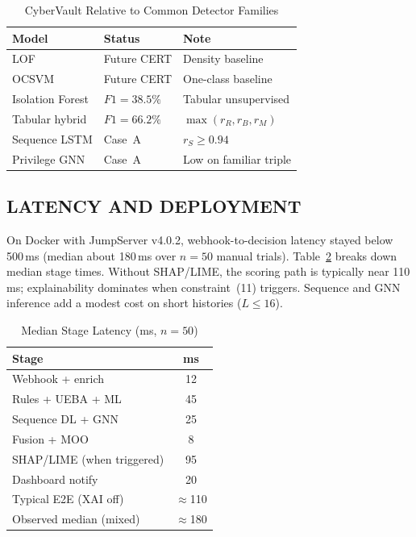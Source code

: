 \documentclass{ieeeaccess}
\begin{document}
\begin{table}[!t]
\caption{CyberVault Relative to Common Detector Families}
\label{tab:lit-compare}
\centering
\scriptsize
\begin{tabular}{@{}llp{}@{}}
\toprule
\textbf{Model} & \textbf{Status} & \textbf{Note} \\
\midrule
LOF~\cite{ref19} & Future CERT & Density baseline \\
OCSVM~\cite{ref20} & Future CERT & One-class baseline \\
Isolation Forest & $F1=38.5\%$ & Tabular unsupervised \\
Tabular hybrid & $F1=66.2\%$ & $\max(r_R,r_B,r_M)$ \\
Sequence LSTM & Case~A & $r_S\geq 0.94$ \\
Privilege GNN & Case~A & Low on familiar triple \\
\bottomrule
\end{tabular}
\end{table}

\subsection{LATENCY AND DEPLOYMENT}
On Docker with JumpServer v4.0.2, webhook-to-decision latency stayed below 500\,ms (median about 180\,ms over $n=50$ manual trials). Table~\ref{tab:latency} breaks down median stage times. Without SHAP/LIME, the scoring path is typically near 110\,ms; explainability dominates when constraint~(11) triggers. Sequence and GNN inference add a modest cost on short histories ($L\leq 16$).

\begin{table}[!t]
\caption{Median Stage Latency (ms, $n=50$)}
\label{tab:latency}
\centering
\scriptsize
\begin{tabular}{@{}lc@{}}
\toprule
\textbf{Stage} & \textbf{ms} \\
\midrule
Webhook + enrich & 12 \\
Rules + UEBA + ML & 45 \\
Sequence DL + GNN & 25 \\
Fusion + MOO & 8 \\
SHAP/LIME (when triggered) & 95 \\
Dashboard notify & 20 \\
Typical E2E (XAI off) & $\approx$110 \\
Observed median (mixed) & $\approx$180 \\
\bottomrule
\end{tabular}
\end{table}
\end{document}
